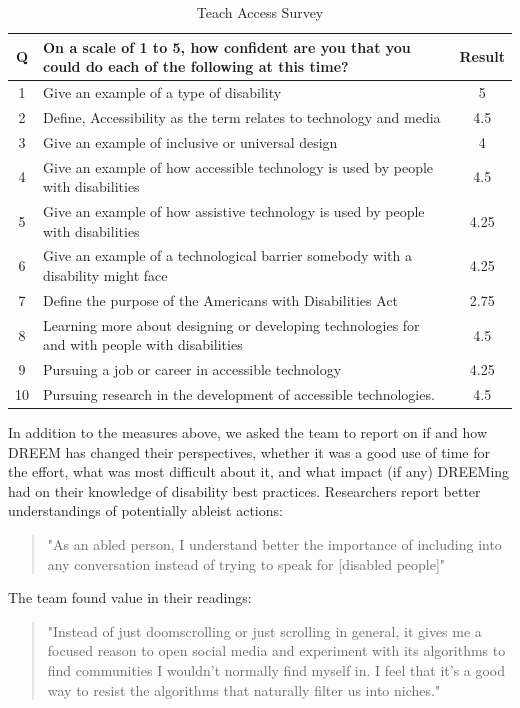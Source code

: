 \begin{table}
  \caption{Teach Access Survey}
  \label{tab:survey}
  \begin{tabular}{clc}
    \toprule
    Q&On a scale of 1 to 5, how confident are you that you could do each of the following at this time?&Result\\
    \midrule
    1 & Give an example of a type of disability& 5\\
    2 & Define‚ Accessibility as the term relates to technology and media & 4.5\\
    3 & Give an example of inclusive or universal design & 4\\
    4 & Give an example of how accessible technology is used by people with disabilities& 4.5\\
    5 & Give an example of how assistive technology is used by people with disabilities & 4.25 \\
    6 & Give an example of a technological barrier somebody with a disability might face & 4.25 \\
    7 & Define the purpose of the Americans with Disabilities Act & 2.75 \\ 
    8 & Learning more about designing or developing technologies for and with people with disabilities & 4.5 \\ 
    9 & Pursuing a job or career in accessible technology & 4.25 \\ 
    10 & Pursuing research in the development of accessible technologies. & 4.5 \\
  \bottomrule
 
\end{tabular}
\end{table}

In addition to the measures above, we asked the team to report on if and how DREEM has changed their perspectives, whether it was a good use of time for the effort, what was most difficult about it, and what impact (if any) DREEMing had on their knowledge of disability best practices. Researchers report better understandings of potentially ableist actions: 
\begin{quote}
    "As an abled person, I understand better the importance of including into any conversation instead of trying to speak for [disabled people]"
\end{quote}

The team found value in their readings: 
\begin{quote}
    "Instead of just doomscrolling or just scrolling in general, it gives me a focused reason to open social media and experiment with its algorithms to find communities I wouldn't normally find myself in. I feel that it's a good way to resist the algorithms that naturally filter us into niches."
\end{quote}

